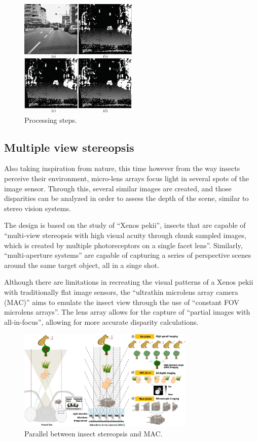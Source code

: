 \begin{figure}[H]
    \includegraphics[width=0.50\textwidth, height=0.45\textwidth]{resources/png/final_result.png}
    \caption{Processing steps.~\cite{withMain}~\label{figSteps}}
\end{figure}

\subsection{Multiple view stereopsis}

Also taking inspiration from nature, this time however from the way insects perceive their
environment, micro-lens arrays focus light in several spots of the image sensor. Through this,
several similar images are created, and those disparities can be analyzed in order to assess
the depth of the scene, similar to stereo vision systems.

The design is based on the study of ``Xenos pekii'', insects that are capable of ``multi-view
stereopsis with high visual acuity through chunk sampled images, which is created by multiple 
photoreceptors on a single facet lens''. Similarly, ``multi-aperture systems'' are capable of
capturing a series of perspective scenes around the same target object, all in a singe shot.
~\cite{withInsects}

Although there are limitations in recreating the visual patterns of a Xenos pekii with traditionally
flat image sensors, the ``ultrathin microlens array camera (MAC)'' aims to emulate the insect view
through the use of ``constant FOV microlens arrays''. The lens array allows for the capture of
``partial images with all-in-focus'', allowing for more accurate disparity calculations.
~\cite{withInsects}

\begin{figure}[H]
    \includegraphics[width=0.75\textwidth, height=0.35\textwidth]{resources/png/paper_working.png}
    \caption{Parallel between insect stereopsis and MAC.~\cite{withInsects}~\label{figInsects}}
\end{figure}

